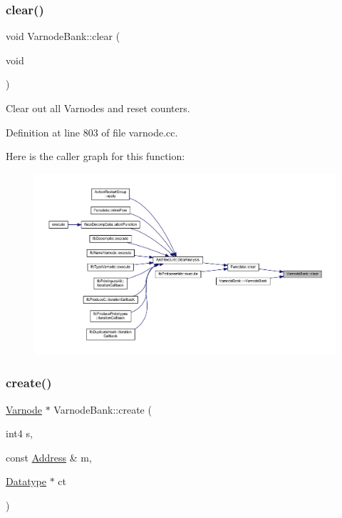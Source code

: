 \subsubsection{\texorpdfstring{clear()}{clear()}}
{\footnotesize\ttfamily void Varnode\+Bank\+::clear (\begin{DoxyParamCaption}\item[{void}]{ }\end{DoxyParamCaption})}



Clear out all Varnodes and reset counters. 



Definition at line 803 of file varnode.\+cc.

Here is the caller graph for this function\+:
\nopagebreak
\begin{figure}[H]
\begin{center}
\leavevmode
\includegraphics[width=350pt]{class_varnode_bank_addcb9e8b2e8d92552c2b142eeacb6f75_icgraph}
\end{center}
\end{figure}
\mbox{\label{class_varnode_bank_ae2effd128dce9205fba1015b45959f1c}} 
\subsubsection{\texorpdfstring{create()}{create()}}
{\footnotesize\ttfamily \mbox{\hyperlink{class_varnode}{Varnode}} $\ast$ Varnode\+Bank\+::create (\begin{DoxyParamCaption}\item[{int4}]{s,  }\item[{const \mbox{\hyperlink{class_address}{Address}} \&}]{m,  }\item[{\mbox{\hyperlink{class_datatype}{Datatype}} $\ast$}]{ct }\end{DoxyParamCaption})}



